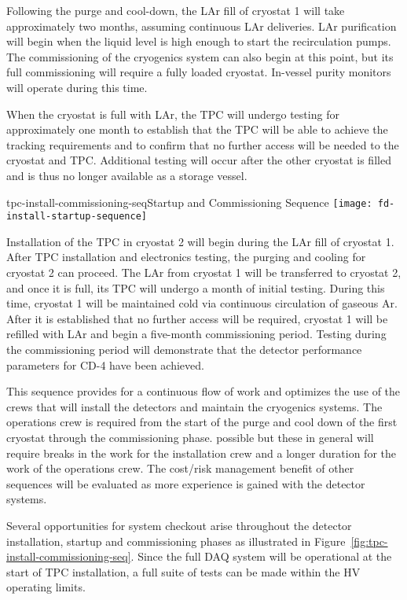 Following the purge and cool-down, the LAr fill of cryostat 1 will take approximately two months, assuming continuous LAr deliveries. LAr purification will begin when the liquid level is high enough to start the recirculation 
pumps. The commissioning of the cryogenics system can also begin at this point, but its full commissioning will require a fully loaded cryostat. In-vessel purity monitors will operate during this time. 

When the cryostat is full with LAr, the TPC will undergo testing for approximately one month to establish that the TPC will be able to achieve the tracking requirements and to confirm that no further access will be needed to the 
cryostat and TPC. Additional testing will occur after the other cryostat is filled and is thus no longer available as a storage vessel. 

\begin{cdrfigure}{tpc-install-commissioning-seq}{Startup and Commissioning Sequence}
\texttt{[image: fd-install-startup-sequence]}
\end{cdrfigure}


Installation of the TPC in cryostat 2 will begin during the LAr fill of cryostat 1. After TPC installation and electronics testing, the purging and cooling for cryostat 2 can proceed. The LAr from cryostat 1 will be 
transferred to cryostat 2, and once it is full, its TPC will undergo a month of initial testing. During this time, cryostat 1 will be maintained cold via continuous circulation of gaseous Ar. After it is established that no further access will be required, cryostat 1 will be refilled with LAr and begin a five-month commissioning period. Testing during the commissioning period will demonstrate that the detector performance parameters for CD-4 have been achieved. 

This sequence provides for a continuous flow of work and optimizes the use of the crews that will install the detectors and maintain the cryogenics systems. The operations crew is required from the start of the purge and 
cool down of the first cryostat through the commissioning phase. possible but these in general will require breaks in the work for the installation crew and a longer duration for the work of the operations crew. The cost/risk 
management benefit of other sequences will be evaluated as more experience is gained with the detector systems. 

Several opportunities for system checkout arise throughout the detector installation, startup and commissioning phases as illustrated in Figure~\ref{fig:tpc-install-commissioning-seq}. Since the full DAQ system will be operational at the start of TPC installation, a 
full suite of tests can be made within the HV operating limits. 

